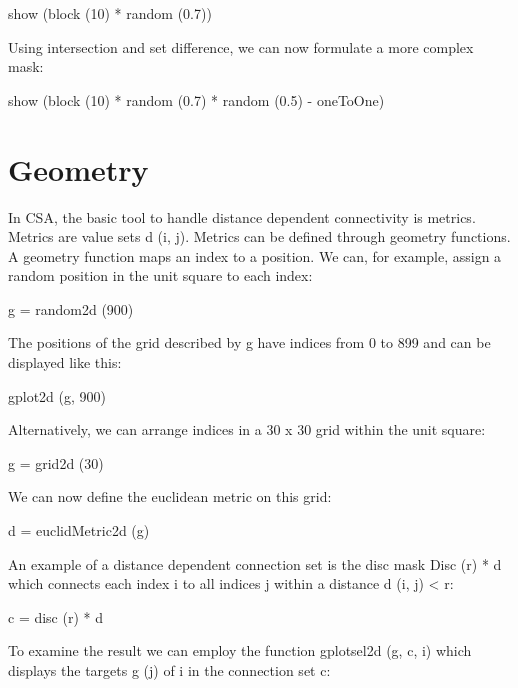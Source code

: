 \documentclass[a4paper,twoside]{report}
\begin{document}
\begin{code}{}
  show (block (10) * random (0.7))
\end{code}

Using intersection and set difference, we can now formulate a more
complex mask:

\begin{code}{}
  show (block (10) * random (0.7) * random (0.5) - oneToOne)
\end{code}

\section{Geometry}

In CSA, the basic tool to handle distance dependent connectivity is
metrics.  Metrics are value sets d (i, j).  Metrics can be defined
through geometry functions.  A geometry function maps an index to a
position.  We can, for example, assign a random position in the unit
square to each index:

\begin{code}{}
  g = random2d (900)
\end{code}

The positions of the grid described by g have indices from 0 to 899
and can be displayed like this:

\begin{code}{}
  gplot2d (g, 900)
\end{code}

Alternatively, we can arrange indices in a 30 x 30 grid within the
unit square:

\begin{code}{}
  g = grid2d (30)
\end{code}

We can now define the euclidean metric on this grid:

\begin{code}{}
  d = euclidMetric2d (g)
\end{code}

An example of a distance dependent connection set is the disc mask
Disc (r) * d which connects each index i to all indices j within a
distance d (i, j) < r:

\begin{code}{}
  c = disc (r) * d
\end{code}

To examine the result we can employ the function gplotsel2d (g, c, i)
which displays the targets g (j) of i in the connection set c:
\end{document}
